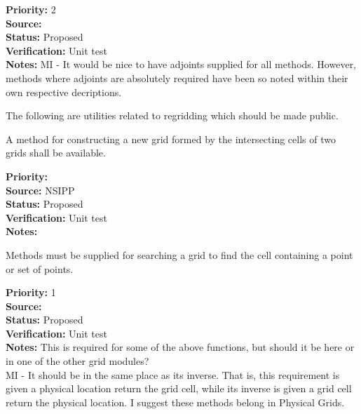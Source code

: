 \begin{reqlist}
{\bf Priority:} 2 \\
{\bf Source:}  \\
{\bf Status:} Proposed \\
{\bf Verification:} Unit test \\
{\bf Notes:} MI - It would be nice to have adjoints supplied for all methods.
             However, methods where adjoints are absolutely required
             have been so noted within their own respective decriptions.
\end{reqlist}


The following are utilities related to regridding which should be made
public.


A method for constructing a new grid formed by the intersecting
cells of two grids shall be available.

\begin{reqlist}
{\bf Priority:}  \\
{\bf Source:}  NSIPP \\
{\bf Status:} Proposed \\
{\bf Verification:} Unit test \\
{\bf Notes:} 
\end{reqlist}


Methods must be supplied for searching a grid to find the cell
containing a point or set of points.

\begin{reqlist}
{\bf Priority:} 1 \\
{\bf Source:}  \\
{\bf Status:} Proposed \\
{\bf Verification:} Unit test \\
{\bf Notes:} This is required for some of the above functions, but
             should it be here or in one of the other grid modules?
             \\
             MI - It should be in the same place as its inverse.
             That is, this requirement is
             given a physical location return the grid cell,
             while its inverse is
             given a grid cell return the physical location.
             I suggest these methods belong in Physical Grids.
\end{reqlist}

